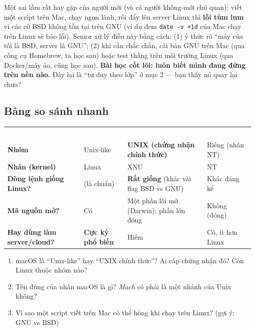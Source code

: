 \documentclass[12pt,a4paper]{article}
\begin{document}
\begin{seniorbox}
Một sai lầm rất hay gặp của người mới (và cả người không-mới chủ quan): viết một script trên Mac, chạy ngon lành, rồi đẩy lên server Linux thì \textbf{lỗi tùm lum} vì các cờ BSD không tồn tại trên GNU (ví dụ đem \texttt{date -v +1d} của Mac chạy trên Linux sẽ báo lỗi). Senior xử lý điều này bằng cách: (1) ý thức rõ ``máy của tôi là BSD, server là GNU''; (2) khi cần chắc chắn, cài bản GNU trên Mac (qua công cụ Homebrew, ta học sau) hoặc test thẳng trên môi trường Linux (qua Docker/máy ảo, cũng học sau). \textbf{Bài học cốt lõi: luôn biết mình đang đứng trên nền nào.} Đây lại là ``tư duy theo lớp'' ở mục 2 — bạn thấy nó quay lại chưa?
\end{seniorbox}

\subsection{Bảng so sánh nhanh}

\renewcommand{\arraystretch}{1.4}
\begin{longtable}{>{\raggedright\arraybackslash}p{3.4cm}>{\raggedright\arraybackslash}p{3.2cm}>{\raggedright\arraybackslash}p{4cm}>{\raggedright\arraybackslash}p{3.4cm}}
\rowcolor{tblhead}\textcolor{white}{\textbf{}} & \textcolor{white}{\textbf{Linux}} & \textcolor{white}{\textbf{macOS}} & \textcolor{white}{\textbf{Windows}} \\
\rowcolor{tblrow}\textbf{Nhóm} & Unix-like & \textbf{UNIX (chứng nhận chính thức)} & Riêng (nhân NT) \\
\textbf{Nhân (kernel)} & Linux & XNU & NT \\
\rowcolor{tblrow}\textbf{Dòng lệnh giống Linux?} & (là chuẩn) & \textbf{Rất giống} (khác vài flag BSD vs GNU) & Khác đáng kể \\
\textbf{Mã nguồn mở?} & Có & Một phần lõi mở (Darwin); phần lớn đóng & Không (đóng) \\
\rowcolor{tblrow}\textbf{Hay dùng làm server/cloud?} & \textbf{Cực kỳ phổ biến} & Hiếm & Có, ít hơn Linux \\
\end{longtable}

\begin{quizbox}
\begin{enumerate}[leftmargin=*]
  \item macOS là ``Unix-like'' hay ``UNIX chính thức''? Ai cấp chứng nhận đó? Còn Linux thuộc nhóm nào?
  \item Tên đúng của nhân macOS là gì? \textit{Mach} có phải là một nhánh của Unix không?
  \item Vì sao một script viết trên Mac có thể hỏng khi chạy trên Linux? (gợi ý: GNU vs BSD)
\end{enumerate}
\end{quizbox}
\end{document}
